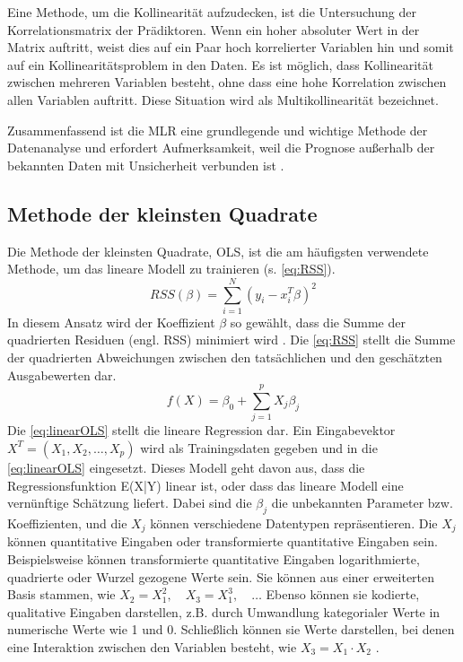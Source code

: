 Eine Methode, um die Kollinearität aufzudecken, ist die Untersuchung der Korrelationsmatrix der Prädiktoren. Wenn ein hoher absoluter Wert in der Matrix auftritt, weist dies auf ein Paar hoch korrelierter Variablen hin und somit auf ein Kollinearitätsproblem in den Daten. Es ist möglich, dass Kollinearität zwischen mehreren Variablen besteht, ohne dass eine hohe Korrelation zwischen allen Variablen auftritt. Diese Situation wird als Multikollinearität bezeichnet.\par
Zusammenfassend ist die \ac{MLR} eine grundlegende und wichtige Methode der Datenanalyse und erfordert Aufmerksamkeit, weil die Prognose außerhalb der 
bekannten Daten mit Unsicherheit verbunden ist \cite{akinkunmi2018data}. 

\subsection{Methode der kleinsten Quadrate}
\label{methodederkleinstenquadrate}
Die Methode der kleinsten Quadrate, \ac{OLS}, ist die am häufigsten verwendete Methode, um das lineare Modell zu trainieren (s. \autoref{eq:RSS}). 
\begin{equation}
RSS(\beta) = \sum_{i=1}^{N} (y_i - x_i^T \beta)^2 
\label{eq:RSS}
\end{equation}
In diesem Ansatz wird der Koeffizient $\beta$ so gewählt, dass die Summe der quadrierten Residuen (engl. \ac{RSS}) minimiert wird \cite{hastie2009elements}. Die \autoref{eq:RSS} stellt die Summe der quadrierten Abweichungen zwischen den tatsächlichen und den geschätzten Ausgabewerten dar. 
\begin{equation}
f(X) = \beta_0 + \sum_{j=1}^{p} X_j \beta_j 
\label{eq:linearOLS}
\end{equation}
Die \autoref{eq:linearOLS} stellt die lineare Regression dar. Ein Eingabevektor \( X^T = (X_1, X_2, \ldots, X_p) \) wird als Trainingsdaten gegeben und in die \autoref{eq:linearOLS} eingesetzt. Dieses Modell geht davon aus, dass die Regressionsfunktion E(X|Y) linear ist, oder dass das lineare Modell eine vernünftige Schätzung liefert. Dabei sind die $\beta_j$ die unbekannten Parameter bzw. Koeffizienten, und die \( X_j \) können verschiedene Datentypen repräsentieren. Die \( X_j \) können quantitative Eingaben oder transformierte quantitative Eingaben sein. Beispielsweise können transformierte quantitative Eingaben logarithmierte, quadrierte oder Wurzel gezogene Werte sein. Sie können aus einer erweiterten Basis stammen, wie \( X_2 = X_1^2, \quad X_3 = X_1^3,\quad \ldots \) Ebenso können sie kodierte, qualitative Eingaben darstellen, z.B. durch Umwandlung kategorialer Werte in numerische Werte wie 1 und 0. Schließlich können sie Werte darstellen, bei denen eine Interaktion zwischen den Variablen besteht, wie \( X_3 = X_1 \cdot X_2 \) \cite{hastie2009elements}.\par
